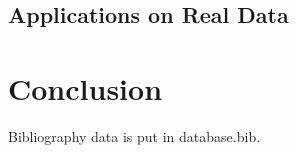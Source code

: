   \subsection{Applications on Real Data}
\section{Conclusion}
\label{sec:ite_conclusion}

Bibliography data is put in database.bib.
\chapterend